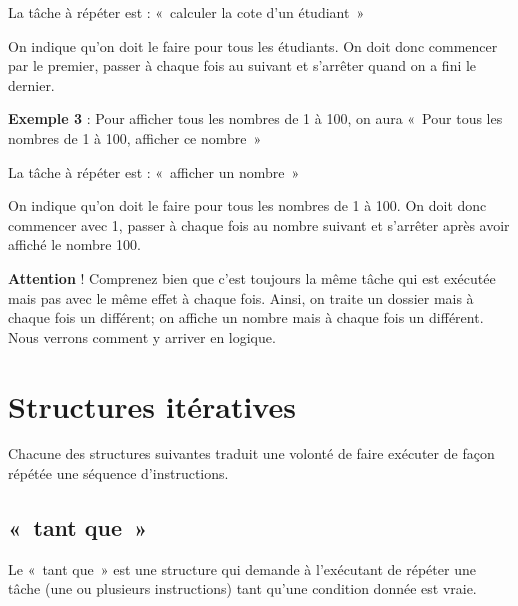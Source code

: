 	\begin{liste}
	\item 
		La tâche à répéter est : «~calculer la cote d'un
		étudiant~»
	\item 
		On indique qu'on doit le faire pour tous les étudiants.
		On doit donc commencer par le premier, passer à chaque fois au suivant
		et s'arrêter quand on a fini le dernier.
	\end{liste}

	\textbf{Exemple 3} : Pour afficher tous les nombres de 1 à 100, on aura
	«~Pour tous les nombres de 1 à 100, afficher ce nombre~»

	\begin{liste}
	\item
		La tâche à répéter est : «~afficher un nombre~»
	\item 
		On indique qu'on doit le faire pour tous les nombres de
		1 à 100. On doit donc commencer avec 1, passer à chaque fois au nombre
		suivant et s'arrêter après avoir affiché le nombre
		100.
	\end{liste}

	\textbf{Attention} ! Comprenez bien que c'est toujours
	la même tâche qui est exécutée mais pas avec le même effet à chaque
	fois. Ainsi, on traite un dossier mais à chaque fois un différent; on
	affiche un nombre mais à chaque fois un différent. Nous verrons comment
	y arriver en logique.

\section{Structures itératives}

	Chacune des structures suivantes traduit une volonté de faire exécuter
	de façon répétée une séquence d’instructions. 

	\subsection{«~tant que~»}

		Le «~tant que~» est une structure qui demande à
		l'exécutant de répéter une tâche (une ou plusieurs
		instructions) tant qu'une condition donnée est vraie.


